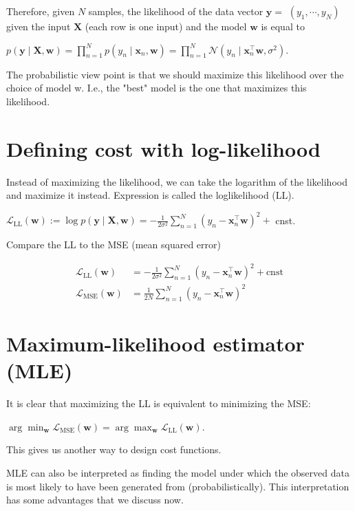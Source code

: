 Therefore, given $N$ samples, the likelihood of the data vector $\mathbf{y}=$ $\left(y_{1}, \cdots, y_{N}\right)$ given the input $\mathbf{X}$ (each row is one input) and the model $\mathbf{w}$ is equal to

$p(\mathbf{y} \mid \mathbf{X}, \mathbf{w})=\prod_{n=1}^{N} p\left(y_{n} \mid \mathbf{x}_{n}, \mathbf{w}\right)=\prod_{n=1}^{N} \mathcal{N}\left(y_{n} \mid \mathbf{x}_{n}^{\top} \mathbf{w}, \sigma^{2}\right)$.

The probabilistic view point is that we should maximize this likelihood over the choice of model w. I.e., the "best" model is the one that maximizes this likelihood.

\section*{Defining cost with log-likelihood}
Instead of maximizing the likelihood, we can take the logarithm of the likelihood and maximize it instead. Expression is called the loglikelihood (LL).

$\mathcal{L}_{\mathrm{LL}}(\mathbf{w}):=\log p(\mathbf{y} \mid \mathbf{X}, \mathbf{w})=-\frac{1}{2 \sigma^{2}} \sum_{n=1}^{N}\left(y_{n}-\mathbf{x}_{n}^{\top} \mathbf{w}\right)^{2}+$ cnst.

Compare the LL to the MSE (mean squared error)

$$
\begin{aligned}
\mathcal{L}_{\mathrm{LL}}(\mathbf{w}) & =-\frac{1}{2 \sigma^{2}} \sum_{n=1}^{N}\left(y_{n}-\mathbf{x}_{n}^{\top} \mathbf{w}\right)^{2}+\mathrm{cnst} \\
\mathcal{L}_{\mathrm{MSE}}(\mathbf{w}) & =\frac{1}{2 N} \sum_{n=1}^{N}\left(y_{n}-\mathbf{x}_{n}^{\top} \mathbf{w}\right)^{2}
\end{aligned}
$$

\section*{Maximum-likelihood estimator (MLE)}
It is clear that maximizing the LL is equivalent to minimizing the MSE:

$\arg \min _{\mathbf{w}} \mathcal{L}_{\mathrm{MSE}}(\mathbf{w})=\arg \max _{\mathbf{w}} \mathcal{L}_{\mathrm{LL}}(\mathbf{w})$.

This gives us another way to design cost functions.

MLE can also be interpreted as finding the model under which the observed data is most likely to have been generated from (probabilistically). This interpretation has some advantages that we discuss now.

